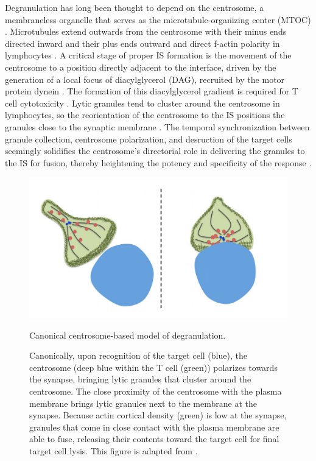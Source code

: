 Degranulation has long been thought to depend on the centrosome, a membraneless organelle that serves as the microtubule-organizing center (MTOC)  \cite{Bettencourt-Dias2007, Pihan2013}. Microtubules extend outwards from the centrosome with their minus ends directed inward and their plus ends outward and direct f-actin polarity in lymphocytes \cite{Pineau2022}. A critical stage of proper IS formation is the movement of the centrosome to a position directly adjacent to the interface, driven by the generation of a local focus of diacylglycerol (DAG), recruited by the motor protein dynein \cite{Quann2009}. The formation of this diacylglycerol gradient is required for T cell cytotoxicity \cite{Quann2009}. Lytic granules tend to cluster around the centrosome in lymphocytes, so the reorientation of the centrosome to the IS positions the granules close to the synaptic membrane \cite{Stinchcombe2007}. The temporal synchronization between granule collection, centrosome polarization,  and desruction of the target cells seemingly solidifies the centrosome's directorial role in delivering the granules to the IS for fusion, thereby heightening the potency and specificity of the response \cite{Stinchcombe2007}. 

\begin{figure}[htbp]
	\centering
	\includegraphics[width=0.8\columnwidth]{../figures/chapter3/centrosome.png}
	\caption{Canonical centrosome-based model of degranulation.}
	\caption*{Canonically, upon recognition of the target cell (blue), the centrosome (deep blue within the T cell (green)) polarizes towards the synapse, bringing  lytic granules that cluster around the centrosome. The close proximity of the centrosome with the plasma membrane brings lytic granules next to the membrane at the synapse. Because actin cortical density (green) is low at the synapse, granules that come in close contact with the plasma membrane are able to fuse, releasing their contents toward the target cell for final target cell lysis. This figure is adapted from \cite{Ritter2013}.}
	\label{fig:centrosome}
\end{figure}

